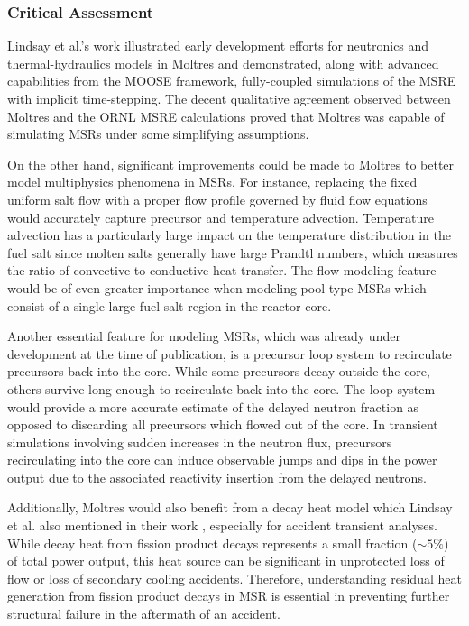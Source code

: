 \subsubsection{Critical Assessment} \label{sec:msre-critique}

Lindsay et al.'s work illustrated early development efforts for neutronics and thermal-hydraulics
models in Moltres and demonstrated, along with advanced capabilities from the \gls{MOOSE}
framework, fully-coupled simulations of the \gls{MSRE} with implicit time-stepping. The
decent qualitative agreement observed between Moltres and the \gls{ORNL}
\gls{MSRE} calculations proved that Moltres was capable of simulating
\glspl{MSR} under some simplifying assumptions.

On the other hand, significant improvements could be made to Moltres to better
model multiphysics phenomena in \glspl{MSR}. For instance, replacing the
fixed uniform salt flow with a proper flow profile governed by fluid flow
equations would accurately capture precursor and temperature advection.
Temperature advection has a particularly large impact on the temperature
distribution in the fuel salt since molten salts generally have large Prandtl
numbers, which measures the ratio of convective to conductive heat transfer.
The flow-modeling feature would be of even greater importance when modeling
pool-type \glspl{MSR} which consist of a single large fuel salt region in the
reactor core.

Another essential feature for modeling \glspl{MSR}, which was already under
development at the time of publication, is a precursor loop
system to recirculate precursors back into the core. While some precursors
decay outside the core, others survive long enough to recirculate back into the
core. The loop system would provide a more accurate estimate of the delayed
neutron fraction as opposed to discarding all precursors which flowed out of
the core. In transient simulations involving sudden increases in the neutron
flux, precursors recirculating into the core can induce observable jumps and
dips in the power output due to the associated reactivity insertion from the
delayed neutrons.

Additionally, Moltres would also benefit from a decay heat model which Lindsay
et al. also mentioned in their work \cite{lindsay_introduction_2018},
especially for accident transient analyses. While decay heat from fission
product decays represents a small fraction ($\sim5\%$) of total power output,
this heat source can be significant in unprotected loss of flow or loss of
secondary cooling accidents. Therefore, understanding residual heat generation
from fission product decays in \gls{MSR} is essential in preventing further
structural failure in the aftermath of an accident.

